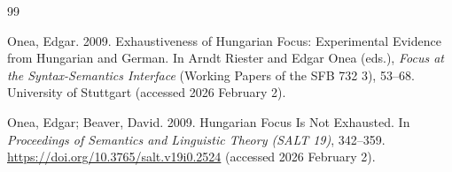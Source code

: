\documentclass[a4paper, ruler]{CUP-JNL-LIN}%
\begin{document}
\begin{Backmatter}
\begin{thebibliography}{99}

{Onea, Edgar}. 2009. Exhaustiveness of Hungarian Focus: Experimental Evidence from Hungarian and German. In Arndt Riester and Edgar Onea (eds.), \textit{Focus at the Syntax-Semantics Interface} (Working Papers of the SFB 732 3), 53--68. University of Stuttgart (accessed 2026 February 2).




{Onea, Edgar; Beaver, David}. 2009. Hungarian Focus Is Not Exhausted. In \textit{Proceedings of Semantics and Linguistic Theory (SALT 19)}, 342--359. \url{https://doi.org/10.3765/salt.v19i0.2524} (accessed 2026 February 2).




\end{thebibliography}
\end{Backmatter}
\end{document}
